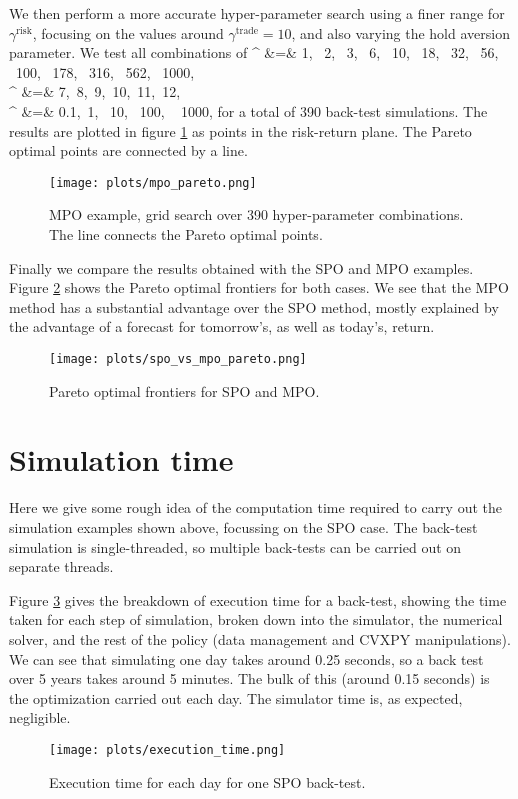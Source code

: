 \documentclass[openany]{now}
\begin{document}
We then perform a more accurate hyper-parameter search
using a finer range for $\gamma^\text{risk}$,
focusing on the values around $\gamma^\text{trade}=10$,
and also varying the hold aversion parameter.
We test all combinations of
\BEAS
\gamma^ &=& 1, ~2, ~3, ~6, ~10, ~18, ~32, ~56, ~100, ~178, ~316, ~562, ~1000,\\
\gamma^ &=& 7,~8,~9,~10,~11,~12,\\
\gamma^ &=& 0.1,~1, ~10,~ 100, ~ 1000,
\EEAS
for a total of 390 back-test simulations.
The results are plotted in
figure \ref{fig:mpo-pareto} as points in the risk-return plane.
The Pareto optimal points are connected by a line.
\begin{figure}
\begin{center}
\texttt{[image: plots/mpo\_pareto.png]}
\end{center}
\caption{MPO example, grid search over 390 hyper-parameter combinations.
The line connects the Pareto optimal points.}
\label{fig:mpo-pareto}
\end{figure}

Finally we compare the results obtained with the SPO and MPO
examples. Figure \ref{fig:spo-mpo-pareto}
shows the Pareto optimal frontiers for both cases.
We see that the MPO method has a substantial advantage over the SPO method,
mostly explained by the advantage of a forecast for tomorrow's, as well as
today's, return.
\begin{figure}
\begin{center}
\texttt{[image: plots/spo\_vs\_mpo\_pareto.png]}
\end{center}
\caption{Pareto optimal frontiers for SPO and MPO.}
\label{fig:spo-mpo-pareto}
\end{figure}

\section{Simulation time}
Here we give some rough idea of the computation time required to
carry out the simulation examples shown above, focussing on the
SPO case.
The back-test simulation is single-threaded, so multiple back-tests
can be carried out on separate threads.

Figure \ref{fig:execution-time} gives the breakdown of execution time
for a back-test, showing the time taken for each step of simulation,
broken down into
the simulator, the numerical solver, and the rest of the
policy (data management and CVXPY manipulations).
We can see that simulating one day takes around 0.25 seconds,
so a back test over 5 years
takes around 5 minutes.
The bulk of this (around 0.15 seconds) is the optimization carried out each day.
The simulator time is, as expected, negligible.
\begin{figure}
\begin{center}
\texttt{[image: plots/execution\_time.png]}
\end{center}
\caption{Execution time for each day for one SPO back-test.}
\label{fig:execution-time}
\end{figure}
\end{document}
